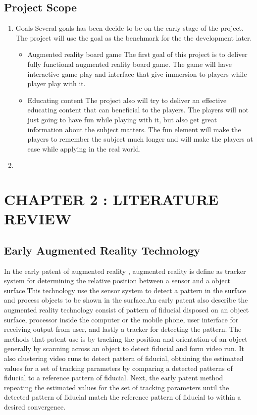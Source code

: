 \documentclass[12pt]{article}
\begin{document}
\subsection{Project Scope}

\begin{enumerate}
    \item Goals
    \newline
    Several goals has been decide to be on the early stage of the project. The project will use the goal as the benchmark for the the development later. 
    \begin{itemize}
        \item Augmented reality board game
        \newline
        The first goal of this project is to deliver fully functional augmented reality board game. The game will have interactive game play and  interface that give immersion to players while player play with it.
        \item Educating content
        \newline
        The project also will try to deliver an effective educating content that can beneficial to the players. The players will not just going to have fun while playing with it, but also get great information about the subject matters. The fun element will make the players to remember the subject much longer and will make the players at ease while applying in the real world.
    \end{itemize}
    \item 
\end{enumerate}

\pagebreak

\section{CHAPTER 2 : LITERATURE REVIEW}

\subsection{Early Augmented Reality Technology}
In the early patent of augmented reality  \cite{meisner2007augmented}, augmented reality is define as tracker system for determining the relative position between a sensor and a object surface.This technology use the sensor system to detect a pattern in the surface and process objects to be shown in the surface.An early patent also describe the augmented reality technology consist of pattern of fiducial disposed on an object surface, processor inside the computer or the mobile phone, user interface for receiving output from user, and lastly a tracker for detecting the pattern. The methods that patent use is by tracking the position and orientation of an object generally by scanning across an object to detect fiducial and form video run. It also clustering video runs to detect pattern of fiducial, obtaining the estimated values for a set of tracking parameters by comparing a detected patterns of fiducial to a reference pattern of fiducial. Next, the early patent method repeating the estimated values for the set of tracking parameters until the detected pattern of fiducial match the reference pattern of fiducial to within a desired convergence.
\end{document}
